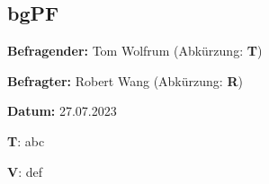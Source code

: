 \subsection{bgPF} \label{T_bgPF}

\textbf{Befragender:} Tom Wolfrum (Abkürzung: \textbf{T})

\textbf{Befragter:} Robert Wang (Abkürzung: \textbf{R})

\textbf{Datum:} 27.07.2023

\begin{list}{X:}{\setlength{\labelsep}{5mm}}
    \linenumbers[1]
    \item[\textbf{T}:] abc
    \item[\textbf{V}:] def 
\end{list}